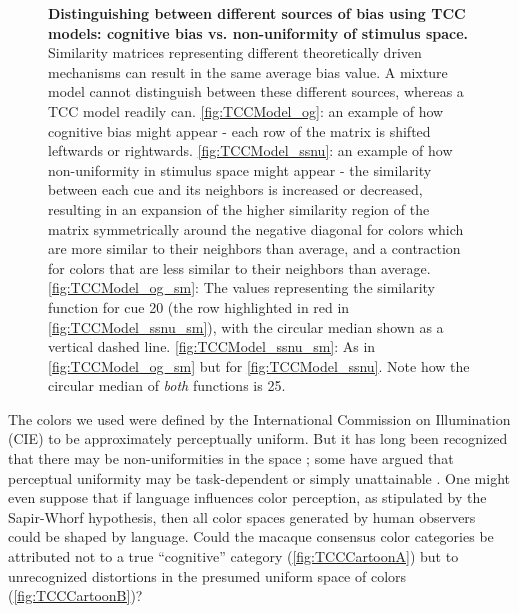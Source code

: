 \begin{figure}
        \caption{\textbf{Distinguishing between different sources of bias using TCC models: cognitive bias vs. non-uniformity of stimulus space.} Similarity matrices representing different theoretically driven mechanisms can result in the same average bias value. A mixture model cannot distinguish between these different sources, whereas a TCC model readily can. \ref{fig:TCCModel_og}: an example of how cognitive bias might appear - each row of the matrix is shifted leftwards or rightwards. \ref{fig:TCCModel_ssnu}: an example of how non-uniformity in stimulus space might appear - the similarity between each cue and its neighbors is increased or decreased, resulting in an expansion of the higher similarity region of the matrix symmetrically around the negative diagonal for colors which are more similar to their neighbors than average, and a contraction for colors that are less similar to their neighbors than average. \ref{fig:TCCModel_og_sm}: The values representing the similarity function for cue 20 (the row highlighted in red in \ref{fig:TCCModel_ssnu_sm}), with the circular median shown as a vertical dashed line. \ref{fig:TCCModel_ssnu_sm}: As in \ref{fig:TCCModel_og_sm} but for \ref{fig:TCCModel_ssnu}. Note how the circular median of \emph{both} functions is 25.}
        \label{fig:TCCDemo}
\end{figure}


The colors we used were defined by the International Commission on Illumination (CIE) to be approximately perceptually uniform. 
But it has long been recognized that there may be non-uniformities in the space%
; some have argued that perceptual uniformity may be task-dependent or simply unattainable%
. 
One might even suppose that if language influences color perception, as stipulated by the Sapir-Whorf hypothesis, then all color spaces generated by human observers could be shaped by language. 
Could the macaque consensus color categories be attributed not to a true “cognitive” category (\autoref{fig:TCCCartoonA}) but to unrecognized distortions in the presumed uniform space of colors (\autoref{fig:TCCCartoonB})? 

